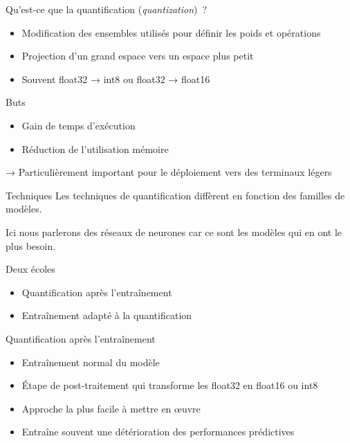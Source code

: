 \begin{frame}{Qu'est-ce que la quantification (\textit{quantization})~?}
  \begin{itemize}
    \item Modification des ensembles utilisés pour définir les poids et opérations
    \item Projection d'un grand espace vers un espace plus petit
    \item Souvent float32 → int8 ou float32 → float16
  \end{itemize}
\end{frame}

\begin{frame}{Buts}
  \begin{itemize}
    \item Gain de temps d'exécution
    \item Réduction de l'utilisation mémoire
  \end{itemize}

  → Particulièrement important pour le déploiement vers des terminaux légers
\end{frame}

\begin{frame}{Techniques}
  Les techniques de quantification diffèrent en fonction des familles de modèles.

  Ici nous parlerons des réseaux de neurones car ce sont les modèles qui en ont le plus besoin.
\end{frame}

\begin{frame}{Deux écoles}
  \begin{itemize}
    \item Quantification après l'entraînement
    \item Entraînement adapté à la quantification
  \end{itemize}
\end{frame}

\begin{frame}{Quantification après l'entraînement}
  \begin{itemize}
    \item Entraînement normal du modèle
    \item Étape de post-traitement qui transforme les float32 en float16 ou int8
    \item Approche la plus facile à mettre en œuvre
    \item Entraîne souvent une détérioration des performances prédictives
  \end{itemize}
\end{frame}

